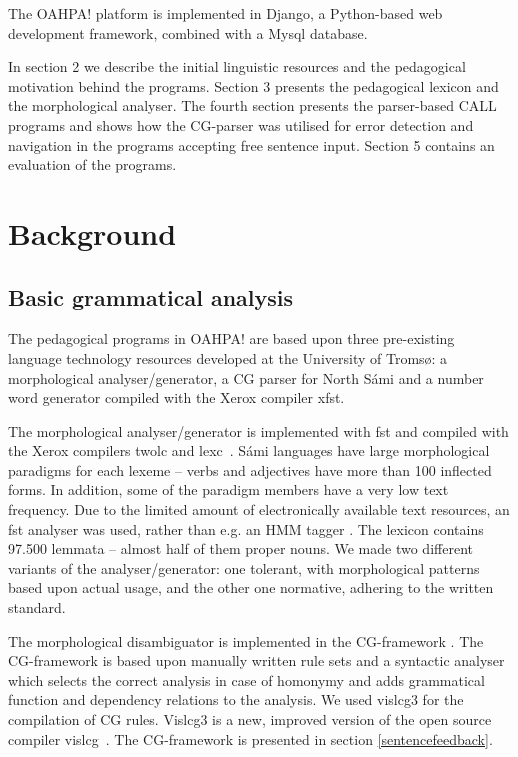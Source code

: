 \documentclass[11pt]{article}
\begin{document}
The OAHPA! platform is implemented in Django, a Python-based web development framework, combined with a Mysql database.

In section 2 we describe the initial linguistic resources and the pedagogical motivation behind the programs. Section 3 presents the pedagogical lexicon and the morphological analyser. The fourth section presents the parser-based CALL programs and shows how the CG-parser was utilised for error detection and navigation in the programs accepting free sentence input. Section 5 contains an evaluation of the programs.


\section{Background}

\subsection{Basic grammatical analysis}
The pedagogical programs in OAHPA! are based upon three pre-existing language technology resources developed at the University of Tromsø: a morphological analyser/generator, a CG parser for North Sámi and a number word generator compiled with the Xerox compiler xfst.

The morphological analyser/generator is implemented with fst and compiled with the Xerox compilers twolc and lexc~\cite{BeesleyKarttunen:03}. Sámi languages have large morphological paradigms for each lexeme -- verbs and adjectives have more than 100 inflected forms. In addition, some of the paradigm members have a very low text frequency. Due to the limited amount of electronically available text resources, an fst analyser was used, rather than e.g. an HMM tagger \cite{Trosterud:07}. The lexicon contains 97.500 lemmata -- almost half of them proper nouns. We made two different variants of the analyser/generator: one tolerant, with morphological patterns based upon actual usage, and the other one normative, adhering to the written standard.  

The morphological disambiguator is implemented in the CG-framework \cite{Karlsson:95}. The CG-framework is based upon manually written rule sets and a syntactic analyser which selects the correct analysis in case of homonymy and adds grammatical function and dependency relations to the analysis. We used vislcg3 for the compilation of CG rules. Vislcg3 is a new, improved version of the open source compiler vislcg~\cite{Visl:08}. The CG-framework is presented in section \ref{sentencefeedback}. 
\end{document}
